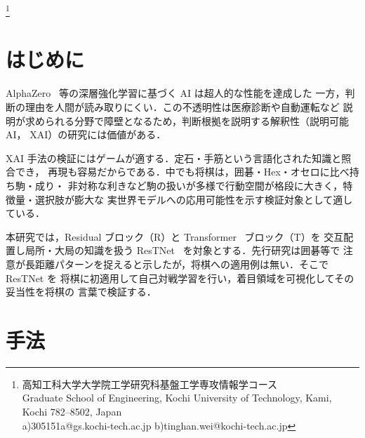 \documentclass[a4paper,10pt,twocolumn]{ltjsarticle}
\newcommand{\blfootnote}[1]{%
  \begingroup
  \renewcommand\thefootnote{}\footnote{#1}%
  \addtocounter{footnote}{-1}%
  \endgroup}
\begin{document}

\blfootnote{\quad 高知工科大学大学院工学研究科基盤工学専攻情報学コース\\
\phantom{1\quad}Graduate School of Engineering, Kochi University of
Technology, Kami, Kochi 782--8502, Japan\\
a)\quad 305151a@gs.kochi-tech.ac.jp\quad
b)\quad tinghan.wei@kochi-tech.ac.jp}

\section{はじめに}
AlphaZero~\cite{alphazero} 等の深層強化学習に基づく AI は超人的な性能を達成した
一方，判断の理由を人間が読み取りにくい．この不透明性は医療診断や自動運転など
説明が求められる分野で障壁となるため，判断根拠を説明する解釈性（説明可能 AI，
XAI）の研究には価値がある．

XAI 手法の検証にはゲームが適する．定石・手筋という言語化された知識と照合でき，
再現も容易だからである．中でも将棋は，囲碁・Hex・オセロに比べ持ち駒・成り・
非対称な利きなど駒の扱いが多様で行動空間が格段に大きく，特徴量・選択肢が膨大な
実世界モデルへの応用可能性を示す検証対象として適している．

本研究では，Residual ブロック（R）と Transformer~\cite{transformer} ブロック（T）を
交互配置し局所・大局の知識を扱う ResTNet~\cite{restnet} を対象とする．先行研究は囲碁等で
注意が長距離パターンを捉えると示したが，将棋への適用例は無い．そこで ResTNet を
将棋に初適用して自己対戦学習を行い，着目領域を可視化してその妥当性を将棋の
言葉で検証する．

\section{手法}
\end{document}
